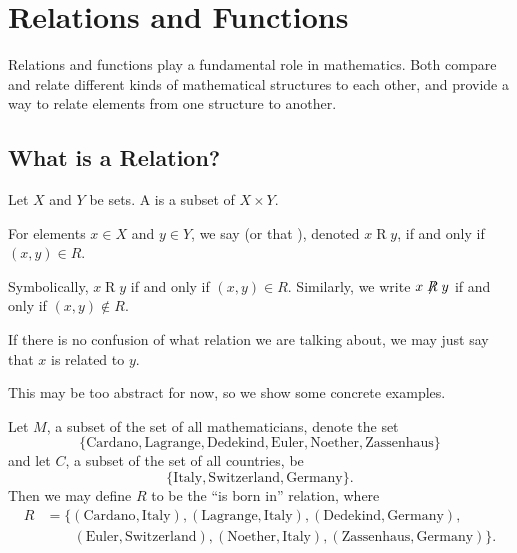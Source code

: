 \chapter{Relations and Functions}
Relations and functions play a fundamental role in mathematics. Both compare and relate different kinds of mathematical structures to each other, and provide a way to relate elements from one structure to another.

\section{What is a Relation?}
\begin{definition}
    Let $X$ and $Y$ be sets. A  is a subset of $X \times Y$.

    For elements $x \in X$ and $y \in Y$, we say  (or that ), denoted $x\mathrel{R}y$, if and only if $(x,y) \in R$.
\end{definition}
\begin{remark}
    Symbolically, $x\mathrel{R}y$ if and only if $(x,y)\in R$. Similarly, we write $x\not\mathrel{R}y$ if and only if $(x,y) \notin R$.
\end{remark}
\begin{remark}
    If there is no confusion of what relation we are talking about, we may just say that $x$ is related to $y$.
\end{remark}

This may be too abstract for now, so we show some concrete examples.
\begin{example}
    Let $M$, a subset of the set of all mathematicians, denote the set
    \[
        \{\text{Cardano}, \text{Lagrange}, \text{Dedekind}, \text{Euler}, \text{Noether}, \text{Zassenhaus}\}
    \]
    and let $C$, a subset of the set of all countries, be
    \[
        \{\text{Italy}, \text{Switzerland}, \text{Germany}\}.
    \]
    Then we may define $R$ to be the ``is born in'' relation, where
    \begin{align*}
        R &= \{(\text{Cardano}, \text{Italy}),(\text{Lagrange}, \text{Italy}),(\text{Dedekind}, \text{Germany}),\\
        &\quad\quad(\text{Euler}, \text{Switzerland}),(\text{Noether}, \text{Italy}),(\text{Zassenhaus}, \text{Germany})\}.
    \end{align*}
\end{example}

